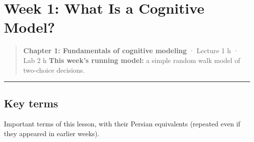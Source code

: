 \section{Week 1: What Is a Cognitive Model?}

\begin{quote}
\textbf{Chapter 1: Fundamentals of cognitive modeling} · Lecture 1 h ·
Lab 2 h \textbf{This week's running model:} a simple random walk model
of two-choice decisions.
\end{quote}

\begin{center}\rule{0.5\linewidth}{0.5pt}\end{center}

\subsection{Key terms}

Important terms of this lesson, with their Persian equivalents (repeated
even if they appeared in earlier weeks).

